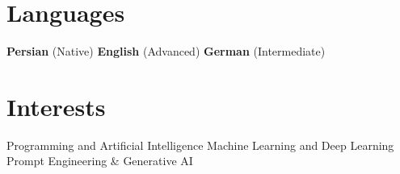 \documentclass[10pt, a4paper]{article}
\begin{document}

\section{Languages}
\begin{center}
\textbf{Persian} (Native) \quad \textbf{English} (Advanced) \quad \textbf{German} (Intermediate)
\end{center}

\section{Interests}
\begin{center}
Programming and Artificial Intelligence \textbar{} Machine Learning and Deep Learning \textbar{} Prompt Engineering \& Generative AI
\end{center}
\end{document}
